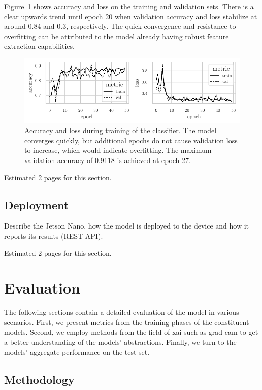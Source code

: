 \documentclass[draft,final]{vutinfth} %
\begin{document}
Figure~\ref{fig:classifier-training-metrics} shows accuracy and loss
on the training and validation sets. There is a clear upwards trend
until epoch 20 when validation accuracy and loss stabilize at around
0.84 and 0.3, respectively. The quick convergence and resistance to
overfitting can be attributed to the model already having robust
feature extraction capabilities.

\begin{figure}
  \centering
  \includegraphics{graphics/classifier-metrics.pdf}
  \caption[Classifier accuracy and loss during training.]{Accuracy and
    loss during training of the classifier. The model converges
    quickly, but additional epochs do not cause validation loss to
    increase, which would indicate overfitting. The maximum validation
    accuracy of 0.9118 is achieved at epoch 27.}
  \label{fig:classifier-training-metrics}
\end{figure}

Estimated 2 pages for this section.

\section{Deployment}

Describe the Jetson Nano, how the model is deployed to the device and
how it reports its results (REST API).

Estimated 2 pages for this section.

\chapter{Evaluation}
\label{chap:evaluation}

The following sections contain a detailed evaluation of the model in
various scenarios. First, we present metrics from the training phases
of the constituent models. Second, we employ methods from the field of
\gls{xai} such as \gls{grad-cam} to get a better understanding of the
models' abstractions. Finally, we turn to the models' aggregate
performance on the test set.

\section{Methodology}
\label{sec:methodology}
\end{document}
